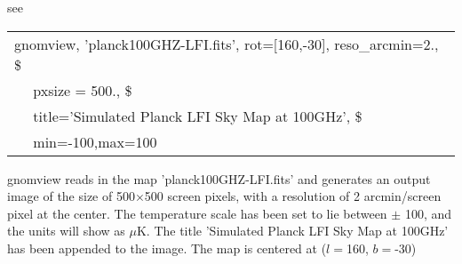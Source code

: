 





\renewcommand{\projfullname}{a gnomic (or gnomonic)}
\begin{codedescription}
{}
\end{codedescription}

%
\begin{related}
  \begin{sulist}{} %
  \item[{\ }] see 
  \end{sulist}
\end{related}

\begin{examples}{1}
{
\begin{tabular}{l} %
gnomview,  'planck100GHZ-LFI.fits', rot=[160,-30], reso\_arcmin=2., \$ \\
$\quad$           pxsize = 500., \$ \\
$\quad$           title='Simulated Planck LFI Sky Map at 100GHz',  \$ \\
$\quad$           min=-100,max=100\\
\end{tabular}
}
{gnomview reads in the map 'planck100GHZ-LFI.fits' and generates
an output image of the size of 500$\times$500 screen pixels, 
with a resolution of 2 arcmin/screen pixel at the center.
The temperature scale has been set to lie between $\pm$ 100, and the units will
show as $\mu$K.
The title 'Simulated Planck
LFI Sky Map at 100GHz' has been appended to the image. 
The map is centered at ($l=$160, $b=$-30) }
\end{examples}

